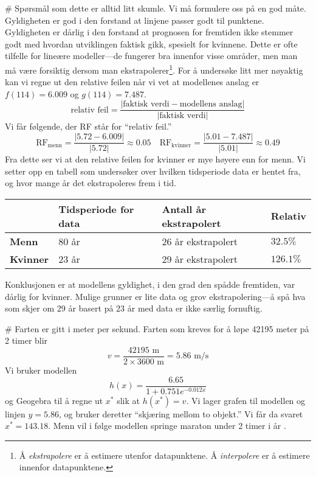 \begin{easylist}[enumerate]
	# Spørsmål som dette er alltid litt skumle. Vi må formulere oss på en god måte.
	Gyldigheten er god i den forstand at linjene passer godt til punktene.
	Gyldigheten er dårlig i den forstand at prognosen for fremtiden ikke stemmer godt med
	hvordan utviklingen faktisk gikk, spesielt for kvinnene. 
	Dette er ofte tilfelle for lineære modeller---de fungerer bra innenfor visse områder, men man må være forsiktig dersom man ekstrapolerer\footnote{Å \emph{ekstrapolere} er å estimere utenfor datapunktene. Å \emph{interpolere} er å estimere innenfor datapunktene.}.
	For å undersøke litt mer nøyaktig kan vi regne ut den relative feilen når vi vet at modellenes anslag er $f(114) = 6.009$ og $g(114) = 7.487$.
	\begin{equation*}
		\text{relativ feil} = \frac{| \text{faktisk verdi} - \text{modellens anslag}|}{|\text{faktisk verdi}|}
	\end{equation*}
	Vi får følgende, der RF står for ``relativ feil.''
	\begin{equation*}
		\text{RF}_{\text{menn}} = \frac{|5.72 - 6.009|}{|5.72|} \approx 0.05 \quad 
		\text{RF}_{\text{kvinner}} = \frac{|5.01 - 7.487|}{|5.01|} \approx 0.49
	\end{equation*}
	Fra dette ser vi at den relative feilen for kvinner er mye høyere enn for menn. 
	Vi setter opp en tabell som undersøker over hvilken tidsperiode data er hentet fra,
	og hvor mange år det ekstrapoleres frem i tid.
	\begin{center}
		\begin{tabular}{l|lll}
		&	\textbf{Tidsperiode for data} & \textbf{Antall år ekstrapolert} & \textbf{Relativ} \\ \hline
		\textbf{Menn} &	80 år & 26 år ekstrapolert & $32.5\%$ \\
		\textbf{Kvinner} &	23 år & 29 år ekstrapolert & $126.1\%$ 
		\end{tabular}
	\end{center}
	Konklusjonen er at modellens gyldighet, i den grad den spådde fremtiden, var dårlig for kvinner.
	Mulige grunner er lite data og grov ekstrapolering---å spå hva som skjer om 29 år basert på 23 år med data er ikke særlig fornuftig.
	
	
	# Farten er gitt i meter per sekund. Farten som kreves for å løpe 42195 meter på 2 timer blir
	\begin{equation*}
		v = \frac{42195\text{ m}}{2 \times 3600 \text{ m}} = 5.86 \text{ m/s}
	\end{equation*}
	Vi bruker modellen
	\begin{equation*}
		h(x) = \frac{6.65}{1 + 0.751e^{-0.012x}}
	\end{equation*}
	og Geogebra til å regne ut $x^*$ slik at $h(x^*) = v$. 
	Vi lager grafen til modellen og linjen $y = 5.86$, og bruker deretter ``skjæring mellom to objekt.''
	Vi får da svaret $x^* = 143.18$. Menn vil i følge modellen springe maraton under 2 timer i år .
	
	


\end{easylist}

